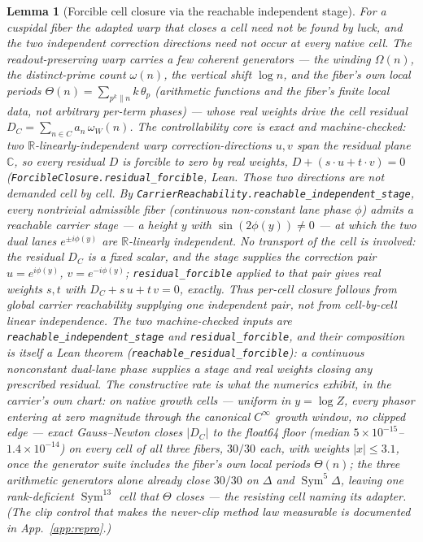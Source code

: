 \documentclass[11pt]{article}
\newtheorem{lemma}[theorem]{Lemma}
\theoremstyle{definition}
\newcommand{\Sym}{\operatorname{Sym}}
\begin{document}
\begin{lemma}[Forcible cell closure via the reachable independent stage]\label{lem:forcible}
For a cuspidal fiber the adapted warp that closes a cell need not be found by luck, and the two independent
correction directions need \emph{not} occur at every native cell. The readout-preserving warp carries a few
\emph{coherent} generators --- the winding $\Omega(n)$, the distinct-prime count $\omega(n)$, the vertical shift
$\log n$, and the fiber's own local periods $\Theta(n)=\sum_{p^k\|n}k\,\theta_p$ (arithmetic functions and the
fiber's finite local data, not arbitrary per-term phases) --- whose real weights drive the cell residual
$D_C=\sum_{n\in C}a_n\,\omega_W(n)$. The controllability core is exact and machine-checked: two
$\mathbb R$-linearly-independent warp correction-directions $u,v$ span the residual plane $\mathbb C$, so
\emph{every} residual $D$ is forcible to zero by real weights, $D+(s\!\cdot\! u+t\!\cdot\! v)=0$
(\texttt{ForcibleClosure.residual\_forcible}, Lean. Those two directions are
not demanded cell by cell. By \texttt{CarrierReachability.reachable\_independent\_stage}, every nontrivial
admissible fiber (continuous non-constant lane phase $\phi$) admits a reachable carrier \emph{stage} --- a height
$y$ with $\sin(2\phi(y))\neq0$ --- at which the two dual lanes $e^{\pm i\phi(y)}$ are $\mathbb R$-linearly
independent. No transport of the cell is involved: the residual $D_C$ is a fixed scalar, and the stage supplies
the correction pair $u=e^{i\phi(y)}$, $v=e^{-i\phi(y)}$; \texttt{residual\_forcible} applied to that pair gives
real weights $s,t$ with $D_C+s\,u+t\,v=0$, exactly. Thus per-cell closure follows from \emph{global} carrier
reachability supplying one independent pair, \emph{not} from cell-by-cell linear independence. The two
machine-checked inputs are \texttt{reachable\_independent\_stage} and \texttt{residual\_forcible}, and their
composition is itself a Lean theorem (\texttt{reachable\_residual\_forcible}): a continuous nonconstant
dual-lane phase supplies a stage and real weights closing any prescribed residual.
The constructive rate is what the numerics exhibit, \emph{in the carrier's own chart}: on native growth
cells --- uniform in $y=\log Z$, every phasor entering at zero magnitude through the canonical $C^{\infty}$
growth window, no clipped edge --- exact Gauss--Newton closes $|D_C|$ to the float64 floor (median
$5\times10^{-15}$--$1.4\times10^{-14}$) on \emph{every} cell of all three fibers, $30/30$ each, with weights
$|x|\le3.1$, once the generator suite includes the fiber's own local periods $\Theta(n)$; the three arithmetic
generators alone already close $30/30$ on $\Delta$ and $\Sym^5\Delta$, leaving one rank-deficient
$\Sym^{13}$ cell that $\Theta$ closes --- the resisting cell naming its adapter. (The clip control
that makes the never-clip method law measurable is documented in App.~\ref{app:repro}.)
\end{lemma}
\end{document}
